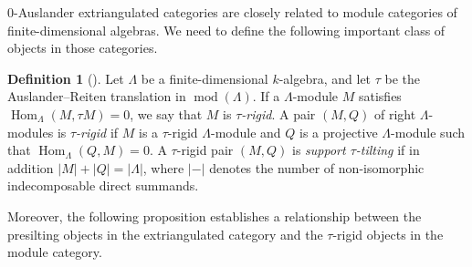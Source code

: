 \documentclass[10pt,twoside, a4paper,reqno]{amsart}
\DeclareMathOperator{\mods}{mod}
\DeclareMathOperator{\Hom}{Hom}
\theoremstyle{definition}
\newtheorem{definition}[theorem]{Definition}
\begin{document}
0-Auslander extriangulated categories are closely related to module categories of finite-dimensional algebras. We need to define the following important class of objects in those categories.

\begin{definition}[{\cite{AIR2014}}]\label{def:tautilt}
    Let $\Lambda$ be a finite-dimensional $k$-algebra, and let $\tau$ be the Auslander--Reiten translation in $\mods(\Lambda)$.
    If a $\Lambda$-module $M$ satisfies $\Hom_{\Lambda}(M,\tau M)=0$, we say that $M$ is \textit{$\tau$-rigid}. A pair $(M,Q)$ of right $\Lambda$-modules is \textit{$\tau$-rigid} if $M$ is a $\tau$-rigid ${\Lambda}$-module and $Q$ is a projective $\Lambda$-module such that $\Hom_{{\Lambda}}(Q,M)=0$. A $\tau$-rigid pair $(M,Q)$ is \textit{support $\tau$-tilting} if in addition $|M|+|Q|=|{\Lambda}|$, where {$|-|$ denotes} the number of non-isomorphic indecomposable direct summands. 
	\end{definition}

\setcounter{theorem}{15}

Moreover, the following proposition establishes a relationship between the presilting objects in the extriangulated category and the $\tau$-rigid objects in the module category.
\end{document}
